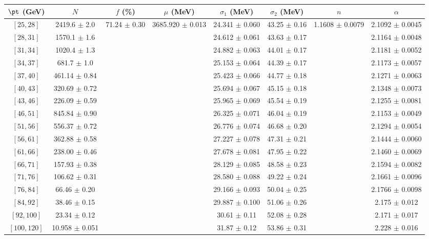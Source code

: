 \begin{tabular}{c||c|c|c|c|c|c|c}
$\pt$ (GeV) & $N$ & $f$ (\%) & $\mu$ (MeV) & $\sigma_1$ (MeV) & $\sigma_2$ (MeV) & $n$ & $\alpha$ \\
\hline
$[25, 28]$ & 2419.6 $\pm$ 2.0 & \multirow{17}{*}{71.24 $\pm$ 0.30} & \multirow{17}{*}{3685.920 $\pm$ 0.013} & 24.341 $\pm$ 0.060 & 43.25 $\pm$ 0.16 & \multirow{17}{*}{1.1608 $\pm$ 0.0079} & 2.1092 $\pm$ 0.0045\\
$[28, 31]$ & 1570.1 $\pm$ 1.6 &  &  & 24.612 $\pm$ 0.061 & 43.63 $\pm$ 0.17 &  & 2.1164 $\pm$ 0.0048\\
$[31, 34]$ & 1020.4 $\pm$ 1.3 &  &  & 24.882 $\pm$ 0.063 & 44.01 $\pm$ 0.17 &  & 2.1181 $\pm$ 0.0052\\
$[34, 37]$ & 681.7 $\pm$ 1.0 &  &  & 25.153 $\pm$ 0.064 & 44.39 $\pm$ 0.17 &  & 2.1173 $\pm$ 0.0057\\
$[37, 40]$ & 461.14 $\pm$ 0.84 &  &  & 25.423 $\pm$ 0.066 & 44.77 $\pm$ 0.18 &  & 2.1271 $\pm$ 0.0063\\
$[40, 43]$ & 320.69 $\pm$ 0.72 &  &  & 25.694 $\pm$ 0.067 & 45.15 $\pm$ 0.18 &  & 2.1348 $\pm$ 0.0073\\
$[43, 46]$ & 226.09 $\pm$ 0.59 &  &  & 25.965 $\pm$ 0.069 & 45.54 $\pm$ 0.19 &  & 2.1255 $\pm$ 0.0081\\
$[46, 51]$ & 845.84 $\pm$ 0.90 &  &  & 26.325 $\pm$ 0.071 & 46.04 $\pm$ 0.19 &  & 2.1153 $\pm$ 0.0049\\
$[51, 56]$ & 556.37 $\pm$ 0.72 &  &  & 26.776 $\pm$ 0.074 & 46.68 $\pm$ 0.20 &  & 2.1294 $\pm$ 0.0054\\
$[56, 61]$ & 362.88 $\pm$ 0.58 &  &  & 27.227 $\pm$ 0.078 & 47.31 $\pm$ 0.21 &  & 2.1444 $\pm$ 0.0060\\
$[61, 66]$ & 238.00 $\pm$ 0.46 &  &  & 27.678 $\pm$ 0.081 & 47.95 $\pm$ 0.22 &  & 2.1460 $\pm$ 0.0069\\
$[66, 71]$ & 157.93 $\pm$ 0.38 &  &  & 28.129 $\pm$ 0.085 & 48.58 $\pm$ 0.23 &  & 2.1594 $\pm$ 0.0082\\
$[71, 76]$ & 106.62 $\pm$ 0.31 &  &  & 28.580 $\pm$ 0.088 & 49.22 $\pm$ 0.24 &  & 2.1661 $\pm$ 0.0096\\
$[76, 84]$ & 66.46 $\pm$ 0.20 &  &  & 29.166 $\pm$ 0.093 & 50.04 $\pm$ 0.25 &  & 2.1766 $\pm$ 0.0098\\
$[84, 92]$ & 38.46 $\pm$ 0.15 &  &  & 29.887 $\pm$ 0.100 & 51.06 $\pm$ 0.26 &  & 2.175 $\pm$ 0.012\\
$[92, 100]$ & 23.34 $\pm$ 0.12 &  &  & 30.61 $\pm$ 0.11 & 52.08 $\pm$ 0.28 &  & 2.171 $\pm$ 0.017\\
$[100, 120]$ & 10.958 $\pm$ 0.051 &  &  & 31.87 $\pm$ 0.12 & 53.86 $\pm$ 0.31 &  & 2.228 $\pm$ 0.016\\
\end{tabular}
